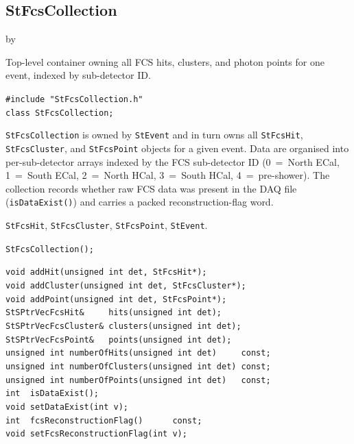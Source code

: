 \documentclass[twoside]{article}
\newcommand{\entrylabel}[1]{\mbox{\textbf{{#1}}}\hfil}%
\newenvironment{entry}
{\begin{list}{}%
    {\renewcommand{\makelabel}{\entrylabel}%
     \setlength{\labelwidth}{90pt}%
     \setlength{\leftmargin}{\labelwidth}
     \advance\leftmargin by \labelsep%
      }%
    }%
  {\end{list}}
\newcommand{\Entrylabel}[1]%
{\raisebox{0pt}[1ex][0pt]{\makebox[\labelwidth][l]%
    {\parbox[t]{\labelwidth}{\hspace{0pt}\textbf{{#1}}}}}}
\newenvironment{Entry}%
{\renewcommand{\entrylabel}{\Entrylabel}\begin{entry}}%
  {\end{entry}}
\begin{document}
\subsection{StFcsCollection}
\label{sec:StFcsCollection}
\begin{Entry}
\item[Summary]
    Top-level container owning all FCS hits, clusters, and photon points for
    one event, indexed by sub-detector ID.

\item[Synopsis]
    \verb+#include "StFcsCollection.h"+\\
    \verb+class StFcsCollection;+\\

\item[Description]
    \texttt{StFcsCollection} is owned by \texttt{StEvent} and in turn owns
    all \texttt{StFcsHit}, \texttt{StFcsCluster}, and \texttt{StFcsPoint}
    objects for a given event.  Data are organised into per-sub-detector
    arrays indexed by the FCS sub-detector ID
    (0~=~North ECal, 1~=~South ECal, 2~=~North HCal, 3~=~South HCal,
    4~=~pre-shower).  The collection records whether raw FCS data was
    present in the DAQ file (\texttt{isDataExist()}) and carries a packed
    reconstruction-flag word.

\item[Related Classes]
    \texttt{StFcsHit}, \texttt{StFcsCluster}, \texttt{StFcsPoint},
    \texttt{StEvent}.

\item[Public\\ Constructors]
    \verb+StFcsCollection();+\\

\item[Public Member\\ Functions]
    \verb+void addHit(unsigned int det, StFcsHit*);+\\
    \verb+void addCluster(unsigned int det, StFcsCluster*);+\\
    \verb+void addPoint(unsigned int det, StFcsPoint*);+\\
    \verb+StSPtrVecFcsHit&     hits(unsigned int det);+\\
    \verb+StSPtrVecFcsCluster& clusters(unsigned int det);+\\
    \verb+StSPtrVecFcsPoint&   points(unsigned int det);+\\
    \verb+unsigned int numberOfHits(unsigned int det)     const;+\\
    \verb+unsigned int numberOfClusters(unsigned int det) const;+\\
    \verb+unsigned int numberOfPoints(unsigned int det)   const;+\\
    \verb+int  isDataExist();+\\
    \verb+void setDataExist(int v);+\\
    \verb+int  fcsReconstructionFlag()      const;+\\
    \verb+void setFcsReconstructionFlag(int v);+\\
\end{Entry}
\clearpage
\end{document}
